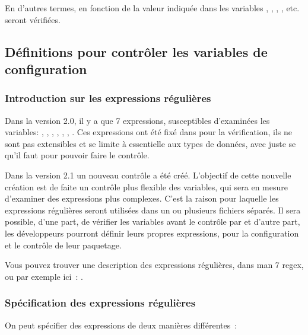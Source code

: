       En d'autres termes, en fonction de la valeur indiquée dans 
      les variables , ,
      , ,
      etc. seront vérifiées.


\subsection{Définitions pour contrôler les variables de configuration}

\subsubsection{Introduction sur les expressions régulières}

  Dans la version 2.0, il y a que 7 expressions, susceptibles d’examinées les
  variables: , , ,
  , , , . Ces
  expressions ont été fixé dans  pour la vérification, ils ne sont pas
  extensibles et se limite à essentielle aux \og{}types de données\fg{}, avec juste se
  qu’il faut pour pouvoir faire le contrôle.

  Dans la version 2.1 un nouveau contrôle a été créé. L'objectif de cette
  nouvelle création est de faite un contrôle plus flexible des variables, qui
  sera en mesure d'examiner des expressions plus complexes. C'est la raison pour
  laquelle les expressions régulières seront utilisées dans un ou plusieurs
  fichiers séparés. Il sera possible, d'une part, de vérifier les variables
  avant le contrôle par  et d'autre part, les développeurs pourront
  définir leurs propres expressions, pour la configuration et le contrôle de
  leur paquetage.

  Vous pouvez trouver une description des expressions régulières, dans
  \og{}man 7 regex\fg{}, ou par exemple ici~: .


\subsubsection{Spécification des expressions régulières}

  On peut spécifier des expressions de deux manières différentes~:

